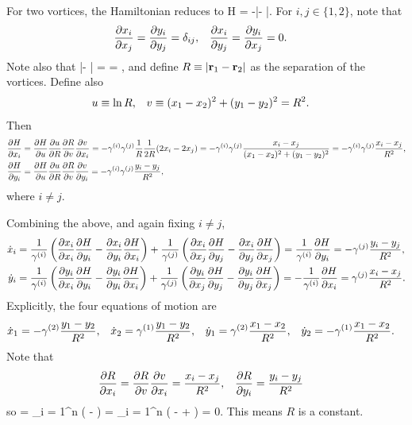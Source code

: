 \begin{solution}
	For two vortices, the Hamiltonian reduces to
	\beq
		H = -\gamq \gamw \ln|\vrq - \vrw|.
	\eeq
	For $i, j \in \{ 1, 2 \}$, note that
	\begin{align*}
		\pdv{x_i}{x_j} &= \pdv{y_i}{y_j} = \delta_{ij}, &
		\pdv{x_i}{y_j} &= \pdv{y_i}{x_j} = 0.
	\end{align*}
	Note also that
	\beq
		|\vrq - \vrw| = 
		= ,
	\eeq
	and define $R \equiv |\mathbf{r}_1 - \mathbf{r}_2|$ as the separation of the vortices.  Define also
	\begin{align*}
		u &\equiv \ln{R}, &
		v &\equiv (x_1 - x_2)^2 + (y_1 - y_2)^2 = R^2.
	\end{align*}
	 Then
	\begin{align*}
		\pdv{H}{x_i} &= \pdv{H}{u} \pdv{u}{R} \pdv{R}{v} \pdv{v}{x_i}
		= -\gamma^{(i)} \gamma^{(j)} \frac{1}{R} \frac{1}{2R} (2 x_i - 2 x_j)
		= -\gamma^{(i)} \gamma^{(j)} \frac{x_i - x_j}{(x_1 - x_2)^2 + (y_1 - y_2)^2}
		= -\gamma^{(i)} \gamma^{(j)} \frac{x_i - x_j}{R^2}, \\
		\pdv{H}{y_i} &= \pdv{H}{u} \pdv{u}{R} \pdv{R}{v} \pdv{v}{y_i}
		= -\gamma^{(i)} \gamma^{(j)} \frac{y_i - y_j}{R^2},
	\end{align*}
	where $i \neq j$.
	
	Combining the above, and again fixing $i \neq j$,
	\begin{align*}
		\dot{x}_i &= \frac{1}{\gamma^{(i)}} \left( \pdv{x_i}{x_i} \pdv{H}{y_i} - \pdv{x_i}{y_i} \pdv{H}{x_i} \right) + \frac{1}{\gamma^{(j)}} \left( \pdv{x_i}{x_j} \pdv{H}{y_j} - \pdv{x_i}{y_j} \pdv{H}{x_j} \right)
		= \frac{1}{\gamma^{(i)}} \pdv{H}{y_i}
		= -\gamma^{(j)} \frac{y_i - y_j}{R^2}, \\
		\dot{y}_i &= \frac{1}{\gamma^{(i)}} \left( \pdv{y_i}{x_i} \pdv{H}{y_i} - \pdv{y_i}{y_i} \pdv{H}{x_i} \right) + \frac{1}{\gamma^{(j)}} \left( \pdv{y_i}{x_j} \pdv{H}{y_j} - \pdv{y_i}{y_j} \pdv{H}{x_j} \right)
		= -\frac{1}{\gamma^{(i)}} \pdv{H}{x_i}
		= \gamma^{(j)} \frac{x_i - x_j}{R^2}.
	\end{align*}
	Explicitly, the four equations of motion are
	\begin{align} \label{4eqns}
		\dot{x}_1 &= -\gamma^{(2)} \frac{y_1 - y_2}{R^2}, &
		\dot{x}_2 &= \gamma^{(1)} \frac{y_1 - y_2}{R^2}, &
		\dot{y}_1 &= \gamma^{(2)} \frac{x_1 - x_2}{R^2}, &
		\dot{y}_2 &= -\gamma^{(1)} \frac{x_1 - x_2}{R^2}.
	\end{align}
	Note that
	\begin{align*}
		\pdv{R}{x_i} &= \pdv{R}{v} \pdv{v}{x_i}
		= \frac{x_i - x_j}{R^2}, &
		\pdv{R}{y_i} &= \frac{y_i - y_j}{R^2}
	\end{align*}
	so
	\beq
		[H, R] = \sum_{i = 1}^n  \left(   -   \right)
		= \sum_{i = 1}^n  \left( -\gami \gamj {}  + \gami \gamj {}  \right)
		= 0.
	\eeq
	This means $R$ is a constant.


\end{solution}
